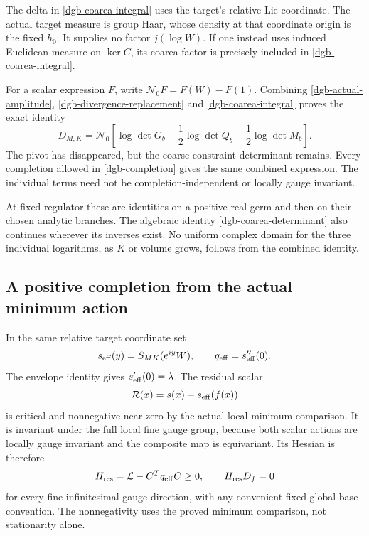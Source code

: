 \documentclass[11pt]{article}
\theoremstyle{remark}
\begin{document}
The delta in \eqref{dgb-coarea-integral} uses the target's
relative Lie coordinate. The actual target measure is group
Haar, whose density at that coordinate origin is the fixed
$h_0$. It supplies no factor $j(\log W)$.
If one instead uses induced Euclidean measure on $\ker C$,
its coarea factor is precisely included in
\eqref{dgb-coarea-integral}.

For a scalar expression $F$, write
$\mathcal N_0F=F(W)-F(1)$. Combining
\eqref{dgb-actual-amplitude},
\eqref{dgb-divergence-replacement} and
\eqref{dgb-coarea-integral} proves the exact identity
\begin{equation}
 \boxed{\displaystyle
 D_{M,K}
   =\mathcal N_0\left[
       \log\det G_b-\frac12\log\det Q_b
                    -\frac12\log\det M_b\right].}
 \label{dgb-main-identity}
\end{equation}
The pivot has disappeared, but the coarse-constraint
determinant remains. Every completion allowed in
\eqref{dgb-completion} gives the same combined expression.
The individual terms need not be completion-independent
or locally gauge invariant.

At fixed regulator these are identities on a positive real
germ and then on their chosen analytic branches. The algebraic
identity \eqref{dgb-coarea-determinant} also continues wherever
its inverses exist. No uniform complex domain for the three
individual logarithms, as $K$ or volume grows, follows from
the combined identity.

\subsection{A positive completion from the actual minimum action}
\label{dgb-residual-section}

In the same relative target coordinate set
\[
 s_{\rm eff}(y)=S_{MK}(e^{iy}W),\qquad
 q_{\rm eff}=s_{\rm eff}''(0).
\]
The envelope identity gives $s_{\rm eff}'(0)=\lambda$.
The residual scalar
\[
                 \mathcal R(x)=s(x)-s_{\rm eff}(f(x))
\]
is critical and nonnegative near zero by the actual local
minimum comparison. It is invariant under the full local
fine gauge group, because both scalar actions are locally
gauge invariant and the composite map is equivariant.
Its Hessian is therefore
\begin{equation}
 H_{\rm res}=\mathcal L-C^Tq_{\rm eff}C\geq0,\qquad
 H_{\rm res}D_f=0
 \label{dgb-residual-Hessian}
\end{equation}
for every fine infinitesimal gauge direction, with any
convenient fixed global base convention.
The nonnegativity uses the proved minimum comparison,
not stationarity alone.
\end{document}
